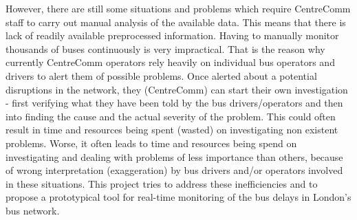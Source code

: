 However, there are still some situations and problems which require CentreComm staff to carry out manual analysis of the available data. This means that there is lack of readily available preprocessed information. Having to manually monitor thousands of buses continuously is very impractical. That is the reason why currently CentreComm operators rely heavily on individual bus operators and drivers to alert them of possible problems. Once alerted about a potential disruptions in the network, they (CentreComm) can start their own investigation - first verifying what they have been told by the bus drivers/operators and then into finding the cause and the actual severity of the problem. This could often result in time and resources being spent (wasted) on investigating non existent problems. Worse, it often leads to time and resources being spend on investigating and dealing with problems of less importance than others, because of wrong interpretation (exaggeration) by bus drivers and/or operators involved in these situations. This project tries to address these inefficiencies and to propose a prototypical tool for real-time monitoring of the bus delays in London's bus network.


